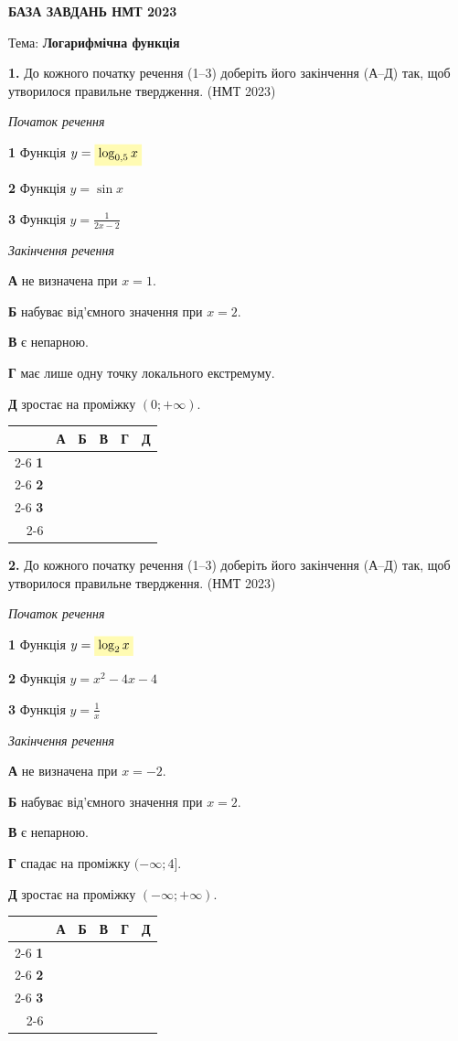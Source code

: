 \documentclass[14pt]{extarticle}
\newcommand{\answerGridSmall}{
    \begingroup
    \renewcommand{\arraystretch}{1.2} 
    \setlength{\tabcolsep}{5pt} 
    \begin{tabular}{r|c|c|c|c|c|}
         \multicolumn{1}{c}{} & \multicolumn{1}{c}{\textbf{А}} & \multicolumn{1}{c}{\textbf{Б}} & \multicolumn{1}{c}{\textbf{В}} & \multicolumn{1}{c}{\textbf{Г}} & \multicolumn{1}{c}{\textbf{Д}} \\ \cline{2-6}
         \textbf{1} & & & & & \\ \cline{2-6}
         \textbf{2} & & & & & \\ \cline{2-6}
         \textbf{3} & & & & & \\ \cline{2-6}
    \end{tabular}
    \endgroup
}
\newcommand{\matchingLayoutBottom}[2]{
    \noindent
    \begin{minipage}[t]{0.48\textwidth}
        #1
    \end{minipage}%
    \hfill
    \begin{minipage}[t]{0.48\textwidth}
        #2
    \end{minipage}
    
    \vspace{0.5cm}
    
    \noindent
    \answerGridSmall
}
\newcommand{\nmtyear}[1]{\hfill{\small\color{yearcolor}(НМТ #1)}}
\begin{document}
\vspace{1cm}

\begin{center}
{\Large\textbf{\color{headerblue}БАЗА ЗАВДАНЬ НМТ 2023}}
\end{center}

\begin{center}
{\large Тема: \textbf{Логарифмічна функція}}
\end{center}

\vspace{0.5cm}


\noindent\textbf{1.} До кожного початку речення (1--3) доберіть його закінчення (А--Д) так, щоб утворилося правильне твердження. \nmtyear{2023}
\vspace{0.3cm}

\matchingLayoutBottom{\textit{Початок речення}

\textbf{1} \quad Функція $y = \colorbox{yellow!30}{$\log_{0,5} x$}$

\textbf{2} \quad Функція $y = \sin x$

\textbf{3} \quad Функція $y = \displaystyle\frac{1}{2x - 2}$
}{
\textit{Закінчення речення}

\textbf{А} \quad не визначена при $x = 1$.

\textbf{Б} \quad набуває від'ємного значення при $x = 2$.

\textbf{В} \quad є непарною.

\textbf{Г} \quad має лише одну точку локального екстремуму.

\textbf{Д} \quad зростає на проміжку $(0; +\infty)$.
}

\vspace{1cm}

\noindent\textbf{2.} До кожного початку речення (1--3) доберіть його закінчення (А--Д) так, щоб утворилося правильне твердження. \nmtyear{2023}
\vspace{0.3cm}

\matchingLayoutBottom{\textit{Початок речення}

\textbf{1} \quad Функція $y = \colorbox{yellow!30}{$\log_2 x$}$

\textbf{2} \quad Функція $y = x^2 - 4x - 4$

\textbf{3} \quad Функція $y = \displaystyle\frac{1}{x}$
}{
\textit{Закінчення речення}

\textbf{А} \quad не визначена при $x = -2$.

\textbf{Б} \quad набуває від'ємного значення при $x = 2$.

\textbf{В} \quad є непарною.

\textbf{Г} \quad спадає на проміжку $(-\infty; 4]$.

\textbf{Д} \quad зростає на проміжку $(-\infty; +\infty)$.
}
\end{document}

